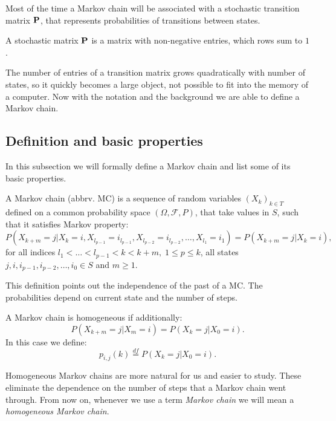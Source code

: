	Most of the time a Markov chain will be associated with a stochastic transition matrix $\mathbf{P}$, that represents probabilities of transitions between states.
	\begin{definition}
		A stochastic matrix $\mathbf{P}$ is a matrix with non-negative entries, which rows sum to $1$.
	\end{definition}
	The number of entries of a transition matrix grows quadratically with number of states, so it quickly becomes a large object, not possible to fit into the memory of a computer. Now with the notation and the background we are able to define a Markov chain.
	
\subsection{Definition and basic properties}
	In this subsection we will formally define a Markov chain and list some of its basic properties.
	
	\begin{definition}
		A Markov chain (abbrv. MC) is a sequence of random variables $\left( X_k\right)_{k \in T}$ defined on a common probability space $\left( \Omega, \mathcal{F}, P \right)$, that take values in $S$, such that it satisfies Markov property:
		\begin{equation*}
			P(X_{k+m} = j | X_k = i, X_{l_{p-1}} = i_{l_{p-1}}, X_{l_{p-2}} = i_{l_{p-2}}, \ldots, X_{l_1} = i_1) = P(X_{k+m} = j | X_k = i),
		\end{equation*}
		for all indices $l_1< \ldots < l_{p-1} < k < k+m, \; 1 \leq p \leq k$, all states $j, i, i_{p-1}, i_{p-2}, \ldots, i_0 \in S$ and $m \geq 1$.
	\end{definition}
	This definition points out the independence of the past of a MC. The probabilities depend on current state and the number of steps.

	\begin{definition}
		A Markov chain is homogeneous if additionally:
		\begin{equation*}
			P(X_{k+m} = j | X_m = i) = P(X_{k} = j | X_0 = i).
		\end{equation*}
		In this case we define:
		\begin{equation*}
			p_{i,j}(k) \overset{df}{=} P(X_{k} = j | X_0 = i).
		\end{equation*}
	\end{definition}
	Homogeneous Markov chains are more natural for us and easier to study. These eliminate the dependence on the number of steps that a Markov chain went through. From now on, whenever we use a term \textit{Markov chain} we will mean a \textit{homogeneous Markov chain}.
	
